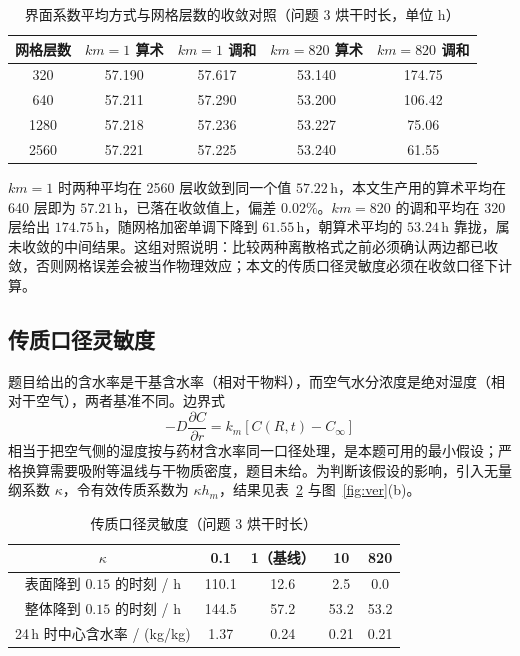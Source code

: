 \documentclass[12pt,a4paper]{ctexart}
\begin{document}
\begin{table}[htbp]
\centering
\caption{界面系数平均方式与网格层数的收敛对照（问题 3 烘干时长，单位 h）}
\label{tab:face}
\begin{tabular}{ccccc}
\toprule
网格层数 & $km{=}1$ 算术 & $km{=}1$ 调和 & $km{=}820$ 算术 & $km{=}820$ 调和 \\
\midrule
320 & 57.190 & 57.617 & 53.140 & 174.75 \\
640 & 57.211 & 57.290 & 53.200 & 106.42 \\
1280 & 57.218 & 57.236 & 53.227 & 75.06 \\
2560 & 57.221 & 57.225 & 53.240 & 61.55 \\
\bottomrule
\end{tabular}
\end{table}

$km=1$ 时两种平均在 2560 层收敛到同一个值 $57.22$\,h，本文生产用的算术平均在 640 层即为 $57.21$\,h，已落在收敛值上，偏差 $0.02\%$。$km=820$ 的调和平均在 320 层给出 $174.75$\,h，随网格加密单调下降到 $61.55$\,h，朝算术平均的 $53.24$\,h 靠拢，属未收敛的中间结果。这组对照说明：比较两种离散格式之前必须确认两边都已收敛，否则网格误差会被当作物理效应；本文的传质口径灵敏度必须在收敛口径下计算。

\subsection{传质口径灵敏度}

题目给出的含水率是干基含水率（相对干物料），而空气水分浓度是绝对湿度（相对干空气），两者基准不同。边界式
\[
-D\frac{\partial C}{\partial r}=k_m\left[C(R,t)-C_\infty\right]
\]
相当于把空气侧的湿度按与药材含水率同一口径处理，是本题可用的最小假设；严格换算需要吸附等温线与干物质密度，题目未给。为判断该假设的影响，引入无量纲系数 $\kappa$，令有效传质系数为 $\kappa h_m$，结果见表~\ref{tab:km} 与图~\ref{fig:ver}(b)。

\begin{table}[htbp]
\centering
\caption{传质口径灵敏度（问题 3 烘干时长）}
\label{tab:km}
\begin{tabular}{ccccc}
\toprule
$\kappa$ & 0.1 & 1（基线） & 10 & 820 \\
\midrule
表面降到 $0.15$ 的时刻 / h & 110.1 & 12.6 & 2.5 & 0.0 \\
整体降到 $0.15$ 的时刻 / h & 144.5 & 57.2 & 53.2 & 53.2 \\
24\,h 时中心含水率 / (kg/kg) & 1.37 & 0.24 & 0.21 & 0.21 \\
\bottomrule
\end{tabular}
\end{table}
\end{document}
